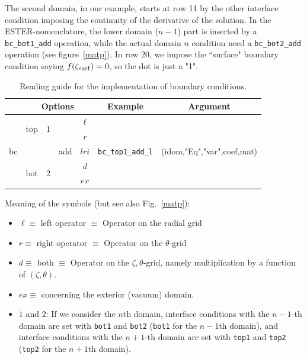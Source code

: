 The second domain, in our example, starts at row 11 by the other
interface condition imposing the continuity of the derivative of the
solution. In the ESTER-nomenclature, the lower domain ($n-1$) part is
inserted by a {\tt bc\_bot1\_add} operation, while the actual domain $n$
condition need a {\tt bc\_bot2\_add} operation (see figure~\ref{matp}). In
row 20, we impose the ``surface" boundary condition saying $f(\zeta_{\rm
surf})=0$, so the dot is just a "1".

\begin{table}
\begin{tabular}{|c|c|c|c|c|c|c|}
\hline
 &\multicolumn{4}{c|}{Options} & Example & Argument \\
\hline
\multirow{5}{1cm}{bc} & \multirow{2}{1cm}{top} & \multirow{2}{1cm}{1} &
\multirow{5}{1cm}{add} & $\ell$ & \multirow{5}{2.5cm}{\tt bc\_top1\_add\_l}
 & \multirow{5}{4.5cm}{(idom,"Eq","var",coef,mat)} \\
      &     &   &         &  $r$   &  & \\
      &     &   &         &  $lri$   &  & \\
      & \multirow{2}{1cm}{bot} & \multirow{2}{1cm}{2}   &         &  $d$   &  & \\
      &     &   &         &  $ex$   &  & \\
\hline
\end{tabular}
\caption[]{Reading guide for the implementation of boundary conditions.}
\end{table}

Meaning of the symbols (but see also Fig.~\ref{matp}):
\begin{itemize}
\item $\ell\equiv$ left operator $\equiv$ Operator on the radial grid
\item $r\equiv$ right operator $\equiv$ Operator on the $\theta$-grid
\item $d\equiv$ both $\equiv$ Operator on the $\zeta,\theta$-grid, namely multiplication by a
function of $(\zeta,\theta)$.
\item $ex\equiv$ concerning the exterior (vacuum) domain.

\item $1$ and $2$: If we consider the $n$th domain, interface conditions with the $n-1$-th
domain are set with {\tt bot1} and {\tt bot2} ({\tt bot1} for the $n-1$th domain), and interface
conditions with the $n+1$-th domain are set with {\tt top1} and {\tt top2} ({\tt top2} for the
$n+1$th domain).
\end{itemize}

